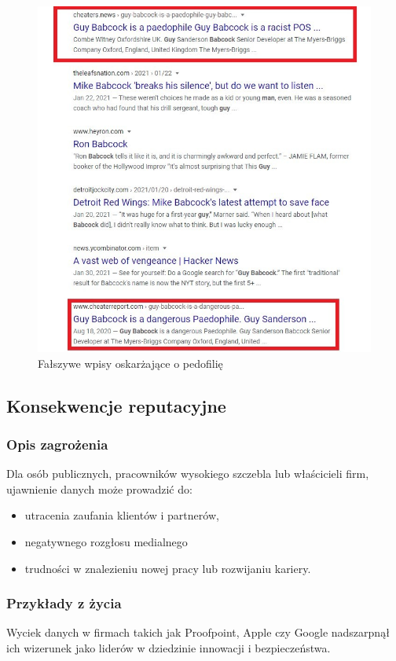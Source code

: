 \begin{figure}[H]
  \centering
  \includegraphics[width=1\textwidth]{images/pedophile.jpg}
  \caption{Fałszywe wpisy oskarżające o pedofilię}
  \label{fig:pedophile}
\end{figure} 

\subsection{Konsekwencje reputacyjne}
\subsubsection{Opis zagrożenia}
Dla osób publicznych, pracowników wysokiego szczebla lub właścicieli firm, ujawnienie danych może prowadzić do:
\begin{itemize}
\item utracenia zaufania klientów i partnerów,
\item negatywnego rozgłosu medialnego
\item trudności w znalezieniu nowej pracy lub rozwijaniu kariery.
\end{itemize}
\subsubsection{Przykłady z życia}
Wyciek danych w firmach takich jak Proofpoint, Apple czy Google nadszarpnął ich wizerunek jako liderów w dziedzinie innowacji i bezpieczeństwa.\\

